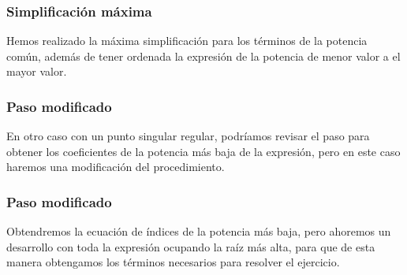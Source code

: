 \begin{frame}
\frametitle{Simplificación máxima}
Hemos realizado la máxima simplificación para los términos de la potencia común, además de tener ordenada la expresión de la potencia de menor valor a el mayor valor.
\end{frame}
\begin{frame}
\frametitle{Paso modificado}
En otro caso con un punto singular regular, podríamos revisar el paso para obtener los coeficientes de la potencia más baja de la expresión, pero en este caso haremos una modificación del procedimiento.
\end{frame}
\begin{frame}
\frametitle{Paso modificado}
Obtendremos la ecuación de índices de la potencia más baja, pero ahoremos un desarrollo con toda la expresión ocupando la raíz más alta, para que de esta manera obtengamos los términos necesarios para resolver el ejercicio.
\end{frame}
